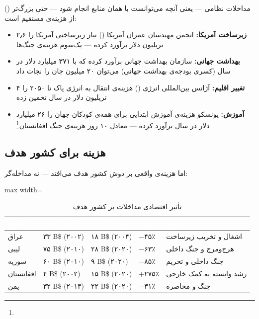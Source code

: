  () مداخلات نظامی — یعنی آنچه می‌توانست با همان منابع انجام شود — حتی بزرگ‌تر از هزینه‌ی مستقیم است:

\begin{tcolorbox}[enemybox, title={هزینه‌ی فرصت: ۸ تریلیون دلار چه می‌توانست بکند؟}]
\begin{itemize}
\item \textbf{زیرساخت آمریکا:} انجمن مهندسان عمران آمریکا () نیاز زیرساختی آمریکا را ۲٫۶ تریلیون دلار برآورد کرده — یک‌سوم هزینه‌ی جنگ‌ها
\item \textbf{بهداشت جهانی:} سازمان بهداشت جهانی برآورد کرده که با ۳۷۱ میلیارد دلار در سال (کسری بودجه‌ی بهداشت جهانی) می‌توان ۲۰ میلیون جان را نجات داد
\item \textbf{تغییر اقلیم:} آژانس بین‌المللی انرژی () هزینه‌ی انتقال به انرژی پاک تا ۲۰۵۰ را ۴ تریلیون دلار در سال تخمین زده
\item \textbf{آموزش:} یونسکو هزینه‌ی آموزش ابتدایی برای همه‌ی کودکان جهان را ۲۶ میلیارد دلار در سال برآورد کرده — معادل ۱۰ روز هزینه‌ی جنگ افغانستان\footnote{}
\end{itemize}
\end{tcolorbox}

\subsection{هزینه برای کشور هدف}
\label{subsec:ch12-costs-target}

اما هزینه‌ی واقعی بر دوش کشور هدف می‌افتد — نه مداخله‌گر:

\begin{table}[htbp]
\centering
\caption{تأثیر اقتصادی مداخلات بر کشور هدف}
\label{tab:ch12-gdp-impact}
\begin{adjustbox}{max width=\linewidth}
\begin{tabularx}{\linewidth}{
    >{\raggedleft\arraybackslash}p{2cm}
    >{\centering\arraybackslash}p{2cm}
    >{\centering\arraybackslash}p{2cm}
    >{\centering\arraybackslash}p{2cm}
    >{\raggedleft\arraybackslash}X
}
\toprule
\rowcolor{PrimaryDeep}
\textcolor{white}{\textbf{کشور}} &
\textcolor{white}{\textbf{GDP قبل}} &
\textcolor{white}{\textbf{GDP پس از}} &
\textcolor{white}{\textbf{تغییر}} &
\textcolor{white}{\textbf{توضیح}} \\
\midrule
عراق & ۳۳ B\$ (۲۰۰۲) & ۱۸ B\$ (۲۰۰۴) & −۴۵٪ & اشغال و تخریب زیرساخت \\
\rowcolor{NeutralLight}
لیبی & ۷۵ B\$ (۲۰۱۰) & ۲۸ B\$ (۲۰۲۰) & −۶۳٪ & هرج‌ومرج و جنگ داخلی \\
سوریه & ۶۰ B\$ (۲۰۱۰) & ۹ B\$ (۲۰۲۰) & −۸۵٪ & جنگ داخلی و تحریم \\
\rowcolor{NeutralLight}
افغانستان & ۴ B\$ (۲۰۰۲) & ۱۵ B\$ (۲۰۲۰) & +۲۷۵٪ & رشد وابسته به کمک خارجی \\
یمن & ۳۲ B\$ (۲۰۱۴) & ۲۲ B\$ (۲۰۲۰) & −۳۱٪ & جنگ و محاصره \\
\bottomrule
\end{tabularx}
\end{adjustbox}
\end{table}

